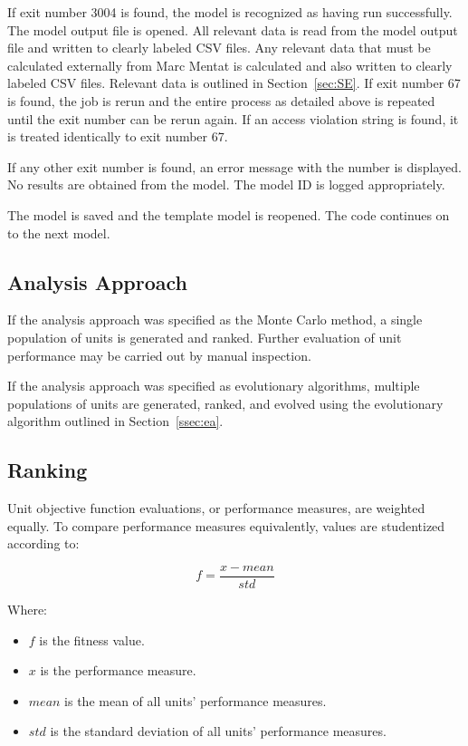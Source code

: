 If exit number 3004 is found, the model is recognized as having run successfully. The model output file is opened. All relevant data is read from the model output file and written to clearly labeled CSV files. Any relevant data that must be calculated externally from Marc Mentat is calculated and also written to clearly labeled CSV files. Relevant data is outlined in Section~\ref{sec:SE}. If exit number 67 is found, the job is rerun and the entire process as detailed above is repeated until the exit number can be rerun again. If an access violation string is found, it is treated identically to exit number 67.

If any other exit number is found, an error message with the number is displayed. No results are obtained from the model. The model ID is logged appropriately.

The model is saved and the template model is reopened. The code continues on to the next model.

\subsection{Analysis Approach}
\label{ssec:aa}

If the analysis approach was specified as the Monte Carlo method, a single population of units is generated and ranked. Further evaluation of unit performance may be carried out by manual inspection.

If the analysis approach was specified as evolutionary algorithms, multiple populations of units are generated, ranked, and evolved using the evolutionary algorithm outlined in Section~\ref{ssec:ea}.

\subsection{Ranking}
\label{ssec:rank}

Unit objective function evaluations, or performance measures, are weighted equally. To compare performance measures equivalently, values are studentized according to:

\begin{equation}
	f=\frac{x-mean}{std}
\end{equation}

Where:

\begin{itemize}
	\item $f$ is the fitness value.
	\item $x$ is the performance measure.
	\item $mean$ is the mean of all units' performance measures.
	\item $std$ is the standard deviation of all units' performance measures.
\end{itemize}

